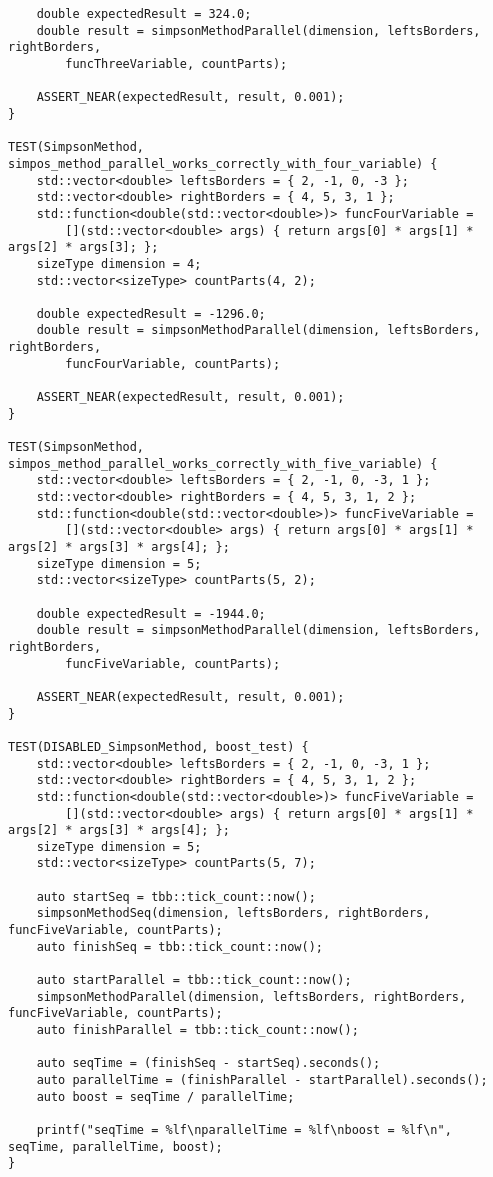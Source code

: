 \documentclass{report}
\begin{document}
\begin{lstlisting}
    double expectedResult = 324.0;
    double result = simpsonMethodParallel(dimension, leftsBorders, rightBorders,
        funcThreeVariable, countParts);

    ASSERT_NEAR(expectedResult, result, 0.001);
}

TEST(SimpsonMethod, simpos_method_parallel_works_correctly_with_four_variable) {
    std::vector<double> leftsBorders = { 2, -1, 0, -3 };
    std::vector<double> rightBorders = { 4, 5, 3, 1 };
    std::function<double(std::vector<double>)> funcFourVariable =
        [](std::vector<double> args) { return args[0] * args[1] * args[2] * args[3]; };
    sizeType dimension = 4;
    std::vector<sizeType> countParts(4, 2);

    double expectedResult = -1296.0;
    double result = simpsonMethodParallel(dimension, leftsBorders, rightBorders,
        funcFourVariable, countParts);

    ASSERT_NEAR(expectedResult, result, 0.001);
}

TEST(SimpsonMethod, simpos_method_parallel_works_correctly_with_five_variable) {
    std::vector<double> leftsBorders = { 2, -1, 0, -3, 1 };
    std::vector<double> rightBorders = { 4, 5, 3, 1, 2 };
    std::function<double(std::vector<double>)> funcFiveVariable =
        [](std::vector<double> args) { return args[0] * args[1] * args[2] * args[3] * args[4]; };
    sizeType dimension = 5;
    std::vector<sizeType> countParts(5, 2);

    double expectedResult = -1944.0;
    double result = simpsonMethodParallel(dimension, leftsBorders, rightBorders,
        funcFiveVariable, countParts);

    ASSERT_NEAR(expectedResult, result, 0.001);
}

TEST(DISABLED_SimpsonMethod, boost_test) {
    std::vector<double> leftsBorders = { 2, -1, 0, -3, 1 };
    std::vector<double> rightBorders = { 4, 5, 3, 1, 2 };
    std::function<double(std::vector<double>)> funcFiveVariable =
        [](std::vector<double> args) { return args[0] * args[1] * args[2] * args[3] * args[4]; };
    sizeType dimension = 5;
    std::vector<sizeType> countParts(5, 7);

    auto startSeq = tbb::tick_count::now();
    simpsonMethodSeq(dimension, leftsBorders, rightBorders, funcFiveVariable, countParts);
    auto finishSeq = tbb::tick_count::now();

    auto startParallel = tbb::tick_count::now();
    simpsonMethodParallel(dimension, leftsBorders, rightBorders, funcFiveVariable, countParts);
    auto finishParallel = tbb::tick_count::now();

    auto seqTime = (finishSeq - startSeq).seconds();
    auto parallelTime = (finishParallel - startParallel).seconds();
    auto boost = seqTime / parallelTime;

    printf("seqTime = %lf\nparallelTime = %lf\nboost = %lf\n", seqTime, parallelTime, boost);
}

\end{lstlisting}
\end{document}
